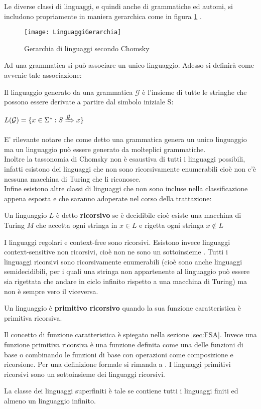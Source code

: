 Le diverse classi di linguaggi, e quindi anche di grammatiche ed automi, si includono propriamente in maniera gerarchica come in figura \ref{fig:linger} .
\begin{figure}[htp]
	\centering
	\texttt{[image: LinguaggiGerarchia]}
	\caption[Gerarchia di linguaggi]{Gerarchia di linguaggi secondo Chomsky}
   \label{fig:linger}
\end{figure}
Ad una grammatica si può associare un unico linguaggio. Adesso si definirà come avvenie tale associazione:
\begin{definizione*}
Il linguaggio generato da una grammatica $\mathcal{G}$ è l'insieme di tutte le stringhe che possono essere derivate a partire dal simbolo iniziale S:\\

\centerline{$L(\mathcal{G}) = \{x \in \Sigma^{*} :S\xRightarrow[]{\mathcal{G}} x\}$}
\end{definizione*}
E' rilevante notare che come detto una grammatica genera un unico linguaggio ma un linguaggio può essere generato da molteplici grammatiche.\\
Inoltre la tassonomia di Chomsky non è esaustiva di tutti i linguaggi possibili, infatti esistono dei linguaggi che non sono ricorsivamente enumerabili cioè non c'è nessuna macchina di Turing che li riconosce.\\
Infine esistono altre classi di linguaggi che non sono incluse nella classificazione appena esposta e che saranno adoperate nel corso della trattazione:
\begin{definizione*} Un linguaggio $L$ è detto \textbf{ricorsivo} se è decidibile cioè esiste una macchina di Turing $M$ che accetta ogni stringa in $x \in L$ e rigetta ogni stringa $x \not\in L$
\end{definizione*}
I linguaggi regolari e context-free sono ricorsivi. Esistono invece linguaggi context-sensitive non ricorsivi, cioè non ne sono un sottoinsieme \cite[p. 124]{Levelt08}. Tutti  i linguaggi ricorsivi sono ricorsivamente enumerabili (cioè sono anche linguaggi semidecidibili, per i quali una stringa non appartenente al linguaggio può essere sia rigettata che andare in ciclo infinito rispetto a una macchina di Turing) ma non è sempre vero il viceversa.
\begin{definizione*}
Un linguaggio è \textbf{primitivo ricorsivo} quando la sua funzione caratteristica è primitiva ricorsiva.
\end{definizione*}
Il concetto di funzione caratteristica è spiegato nella sezione \ref{sec:FSA}. Invece una funzione primitiva ricorsiva è una funzione definita come una delle funzioni di base o combinando le funzioni di base con operazioni come composizione e ricorsione. Per una definizione formale si rimanda a \cite{Rob47}. I linguaggi primitivi ricorsivi sono un sottoinsieme dei linguaggi ricorsivi.
\begin{definizione*}
La classe dei linguaggi superfiniti è tale se contiene tutti i linguaggi finiti ed almeno un linguaggio infinito.
\end{definizione*}
 
